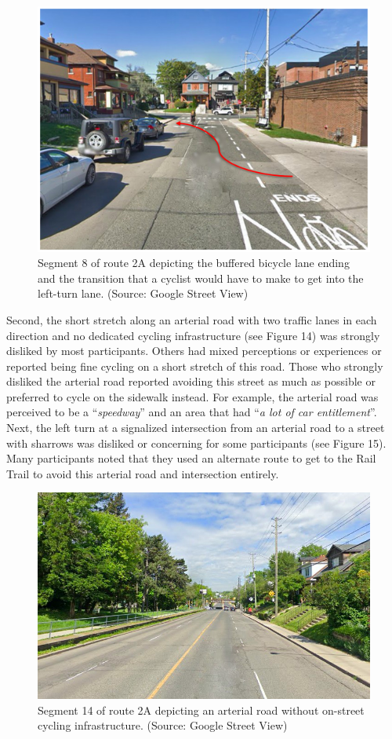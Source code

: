 \documentclass[]{elsarticle} %
\begin{document}
\begin{figure}

{\centering \includegraphics[width=0.65\linewidth]{Figure 13} 

}

\caption{Segment 8 of route 2A depicting the buffered bicycle lane ending and the transition that a cyclist would have to make to get into the left-turn lane. (Source: Google Street View)}\label{fig:figure-13}
\end{figure}

Second, the short stretch along an arterial road with two traffic lanes
in each direction and no dedicated cycling infrastructure (see Figure
14) was strongly disliked by most participants. Others had mixed
perceptions or experiences or reported being fine cycling on a short
stretch of this road. Those who strongly disliked the arterial road
reported avoiding this street as much as possible or preferred to cycle
on the sidewalk instead. For example, the arterial road was perceived to
be a ``\emph{speedway}'' and an area that had ``\emph{a lot of car
entitlement}''. Next, the left turn at a signalized intersection from an
arterial road to a street with sharrows was disliked or concerning for
some participants (see Figure 15). Many participants noted that they
used an alternate route to get to the Rail Trail to avoid this arterial
road and intersection entirely.

\begin{figure}

{\centering \includegraphics[width=0.65\linewidth]{Figure 14} 

}

\caption{Segment 14 of route 2A depicting an arterial road without on-street cycling infrastructure. (Source: Google Street View)}\label{fig:figure-14}
\end{figure}
\end{document}
